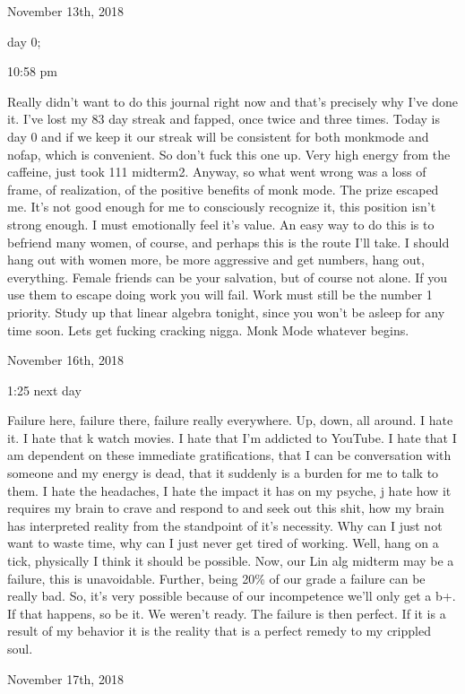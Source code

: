 \bigskip
\bigskip
November 13th, 2018

day 0;

10:58 pm

Really didn't want to do this journal right now and that's precisely why
I've done it. I've lost my 83 day streak and fapped, once twice and
three times. Today is day 0 and if we keep it our streak will be
consistent for both monkmode and nofap, which is convenient. So don't
fuck this one up. Very high energy from the caffeine, just took 111
midterm2. Anyway, so what went wrong was a loss of frame, of
realization, of the positive benefits of monk mode. The prize escaped
me. It's not good enough for me to consciously recognize it, this
position isn't strong enough. I must emotionally feel it's value. An
easy way to do this is to befriend many women, of course, and perhaps
this is the route I'll take. I should hang out with women more, be more
aggressive and get numbers, hang out, everything. Female friends can be
your salvation, but of course not alone. If you use them to escape doing
work you will fail. Work must still be the number 1 priority. Study up
that linear algebra tonight, since you won't be asleep for any time
soon. Lets get fucking cracking nigga. Monk Mode whatever begins.

\bigskip
\bigskip
November 16th, 2018

1:25 next day

Failure here, failure there, failure really everywhere. Up, down, all
around. I hate it. I hate that k watch movies. I hate that I'm addicted
to YouTube. I hate that I am dependent on these immediate
gratifications, that I can be conversation with someone and my energy is
dead, that it suddenly is a burden for me to talk to them. I hate the
headaches, I hate the impact it has on my psyche, j hate how it requires
my brain to crave and respond to and seek out this shit, how my brain
has interpreted reality from the standpoint of it's necessity. Why can I
just not want to waste time, why can I just never get tired of working.
Well, hang on a tick, physically I think it should be possible. Now, our
Lin alg midterm may be a failure, this is unavoidable. Further, being
20\% of our grade a failure can be really bad. So, it's very possible
because of our incompetence we'll only get a b+. If that happens, so be
it. We weren't ready. The failure is then perfect. If it is a result of
my behavior it is the reality that is a perfect remedy to my crippled
soul.

\bigskip
\bigskip
November 17th, 2018

